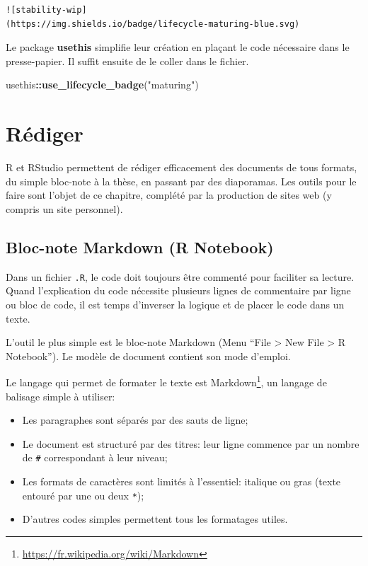\documentclass[
  12pt,
  french,
  a4paper,
  extrafontsizes,onecolumn,openright
  ]{memoir}
\newenvironment{Shaded}{\begin{snugshade}}{\end{snugshade}}
\newcommand{\KeywordTok}[1]{\textcolor[rgb]{0.13,0.29,0.53}{\textbf{#1}}}
\newcommand{\NormalTok}[1]{#1}
\newcommand{\OperatorTok}[1]{\textcolor[rgb]{0.81,0.36,0.00}{\textbf{#1}}}
\newcommand{\StringTok}[1]{\textcolor[rgb]{0.31,0.60,0.02}{#1}}
\providecommand{\tightlist}{%
  \setlength{\itemsep}{0pt}\setlength{\parskip}{0pt}}
\begin{document}
\begin{verbatim}
![stability-wip]
(https://img.shields.io/badge/lifecycle-maturing-blue.svg)
\end{verbatim}

Le package \textbf{usethis} simplifie leur création en plaçant le code nécessaire dans le presse-papier.
Il suffit ensuite de le coller dans le fichier.

\scriptsize

\begin{Shaded}
\begin{Highlighting}[]
\NormalTok{usethis}\OperatorTok{::}\KeywordTok{use_lifecycle_badge}\NormalTok{(}\StringTok{"maturing"}\NormalTok{)}
\end{Highlighting}
\end{Shaded}

\normalsize

\hypertarget{chap:rediger}{%
\chapter{Rédiger}\label{chap:rediger}}

R et RStudio permettent de rédiger efficacement des documents de tous formats, du simple bloc-note à la thèse, en passant par des diaporamas.
Les outils pour le faire sont l'objet de ce chapitre, complété par la production de sites web (y compris un site personnel).

\hypertarget{bloc-note-markdown-r-notebook}{%
\section{Bloc-note Markdown (R Notebook)}\label{bloc-note-markdown-r-notebook}}

Dans un fichier \texttt{.R}, le code doit toujours être commenté pour faciliter sa lecture.
Quand l'explication du code nécessite plusieurs lignes de commentaire par ligne ou bloc de code, il est temps d'inverser la logique et de placer le code dans un texte.

L'outil le plus simple est le bloc-note Markdown (Menu \enquote{File \textgreater{} New File \textgreater{} R Notebook}).
Le modèle de document contient son mode d'emploi.

Le langage qui permet de formater le texte est Markdown\footnote{\url{https://fr.wikipedia.org/wiki/Markdown}}, un langage de balisage simple à utiliser:

\begin{itemize}
\tightlist
\item
  Les paragraphes sont séparés par des sauts de ligne;
\item
  Le document est structuré par des titres: leur ligne commence par un nombre de \texttt{\#} correspondant à leur niveau;
\item
  Les formats de caractères sont limités à l'essentiel: italique ou gras (texte entouré par une ou deux \texttt{*});
\item
  D'autres codes simples permettent tous les formatages utiles.
\end{itemize}
\end{document}
